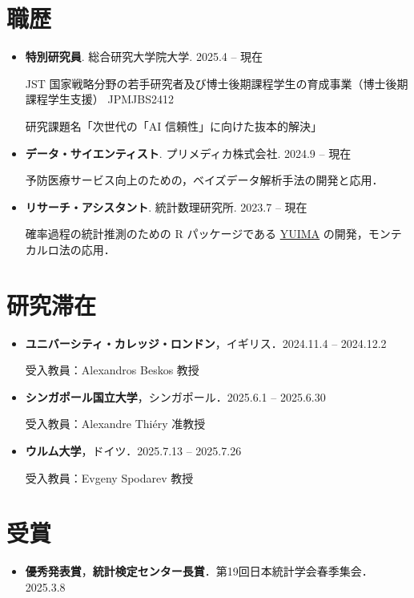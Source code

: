 \documentclass[
  11pt,
]{article}
\providecommand{\tightlist}{%
  \setlength{\itemsep}{0pt}\setlength{\parskip}{0pt}}\usepackage{longtable,booktabs,array}
\renewcommand{\labelitemi}{\textcolor{minty}{\faCheckCircle}} %
\begin{document}
\section{職歴}\label{ux8077ux6b74}

\renewcommand{\labelitemi}{\textcolor{minty}{\faSuitcase}}

\begin{itemize}
\item
  \textbf{特別研究員}. 総合研究大学院大学. \hfill {2025.4 -- 現在}

  JST
  国家戦略分野の若⼿研究者及び博⼠後期課程学⽣の育成事業（博⼠後期課程学⽣⽀援）
  JPMJBS2412

  研究課題名「次世代の「AI 信頼性」に向けた抜本的解決」
\item
  \textbf{データ・サイエンティスト}. プリメディカ株式会社.
  \hfill {2024.9 -- 現在}

  予防医療サービス向上のための，ベイズデータ解析手法の開発と応用．
\item
  \textbf{リサーチ・アシスタント}. 統計数理研究所. \hfill {2023.7 --
  現在}

  確率過程の統計推測のための R パッケージである
  \href{https://r-forge.r-project.org/projects/yuima/}{YUIMA}
  の開発，モンテカルロ法の応用．
\end{itemize}

\section{研究滞在}\label{ux7814ux7a76ux6edeux5728}

\renewcommand{\labelitemi}{\textcolor{minty}{\faUniversity}}

\begin{itemize}
\item
  \textbf{ユニバーシティ・カレッジ・ロンドン}，イギリス．\hfill {2024.11.4
  -- 2024.12.2}

  受入教員：Alexandros Beskos 教授
\item
  \textbf{シンガポール国立大学}，シンガポール．\hfill {2025.6.1 --
  2025.6.30}

  受入教員：Alexandre Thiéry 准教授
\item
  \textbf{ウルム大学}，ドイツ．\hfill {2025.7.13 -- 2025.7.26}

  受入教員：Evgeny Spodarev 教授
\end{itemize}

\section{受賞}\label{ux53d7ux8cde}

\renewcommand{\labelitemi}{\textcolor{minty}{\faAward}}

\begin{itemize}
\tightlist
\item
  \textbf{優秀発表賞}，\textbf{統計検定センター長賞}．第19回日本統計学会春季集会．\hfill {2025.3.8}
\end{itemize}

\renewcommand{\labelitemi}{\textcolor{minty}{\faBookmark}}
\end{document}
